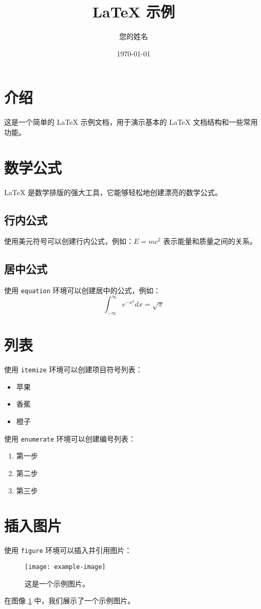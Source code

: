\documentclass{article} %
\title{LaTeX 示例} %
\author{您的姓名}   %
\date{\today}       %
\begin{document}
	
	\maketitle %
	
	\section{介绍} %
	这是一个简单的 LaTeX 示例文档，用于演示基本的 LaTeX 文档结构和一些常用功能。
	
	\section{数学公式} %
	LaTeX 是数学排版的强大工具，它能够轻松地创建漂亮的数学公式。
	
	\subsection{行内公式}
	使用美元符号可以创建行内公式，例如：$E=mc^2$ 表示能量和质量之间的关系。
	
	\subsection{居中公式}
	使用 \texttt{equation} 环境可以创建居中的公式，例如：
	\begin{equation}
		\int_{-\infty}^{\infty} e^{-x^2} dx = \sqrt{\pi}
	\end{equation}
	
	\section{列表} %
	使用 \texttt{itemize} 环境可以创建项目符号列表：
	\begin{itemize}
		\item 苹果
		\item 香蕉
		\item 橙子
	\end{itemize}
	
	使用 \texttt{enumerate} 环境可以创建编号列表：
	\begin{enumerate}
		\item 第一步
		\item 第二步
		\item 第三步
	\end{enumerate}
	
	\section{插入图片} %
	使用 \texttt{figure} 环境可以插入并引用图片：
	\begin{figure}[htbp]
		\centering
		\texttt{[image: example-image]} %
		\caption{这是一个示例图片。}
		\label{fig:example}
	\end{figure}
	
	在图像 \ref{fig:example} 中，我们展示了一个示例图片。
	
\end{document}

